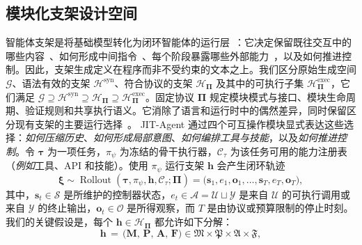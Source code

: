 \documentclass{article}
\newcommand{\ourmethod}{JIT-Agent\xspace}
\begin{document}
\vspace{-0.5em}
\subsection{模块化支架设计空间}
\vspace{-0.5em}
智能体支架是将基础模型转化为闭环智能体的运行层~\citep{202604.0428,zhou2026externalizationllmagentsunified}：它决定保留既往交互中的哪些内容~\citep{hu2026memoryageaiagents}、如何形成中间指令~\citep{cao2025largelanguagemodelsplanning}、每个阶段暴露哪些外部能力~\citep{xu2026agentskillslargelanguage,yang2026efficientagentsmemorytool}，以及如何推进控制。因此，支架生成定义在程序而非不受约束的文本之上。我们区分原始生成空间 $\mathcal{G}$、语法有效的支架 $\mathcal{H}^{\mathrm{syn}}$、符合协议的支架 $\mathcal{H}_{\boldsymbol{\Pi}}$ 及其中的可执行子集 $\mathcal{H}^{\mathrm{exec}}_{\boldsymbol{\Pi}}$，它们满足 $\mathcal{G}\supseteq\mathcal{H}^{\mathrm{syn}}\supseteq\mathcal{H}_{\boldsymbol{\Pi}}\supseteq\mathcal{H}^{\mathrm{exec}}_{\boldsymbol{\Pi}}$。固定协议 $\boldsymbol{\Pi}$ 规定模块模式与接口、模块生命周期、验证规则和共享执行语义。它消除了语言和运行时中的偶然差异，同时保留区分现有支架的主要运行选择~\citep{autogen,githubGitHubAg2aiag2,githubGitHubLangchainailanggraph,luo2025largelanguagemodelagent}。
\ourmethod 通过四个可互操作模块显式表达这些选择：\textit{如何压缩历史}、\textit{如何形成局部意图}、\textit{如何编排工具与技能}，以及\textit{如何推进控制}。令 $\boldsymbol{\tau}$ 为一项任务，$\pi_{\psi}$ 为冻结的骨干执行器，$\mathcal{C}_{\tau}$ 为该任务可用的能力注册表（\textit{例如}工具、API 和技能）。使用 $\pi_{\psi}$ 运行支架 $\mathbf{h}$ 会产生闭环轨迹
\begin{equation}
\label{eq:trajectory}
    \boldsymbol{\xi}
    \sim \operatorname{Rollout}(\boldsymbol{\tau},\pi_{\psi},\mathbf{h},\mathcal{C}_{\tau};\boldsymbol{\Pi})
    = \bigl(\mathbf{s}_1,e_1,\mathbf{o}_1,\ldots,\mathbf{s}_T,e_T,\mathbf{o}_T\bigr),
\end{equation}
其中，$\mathbf{s}_t\in\mathcal{S}$ 是所维护的控制器状态，$e_t\in\mathcal{A}=\mathcal{U}\sqcup\mathcal{Y}$ 是来自 $\mathcal{U}$ 的可执行调用或来自 $\mathcal{Y}$ 的终止输出，$\mathbf{o}_t\in\mathcal{O}$ 是所得观察，而 $T$ 是由协议或预算限制的停止时刻。我们的关键假设是，每个 $\mathbf{h}\in\mathcal{H}_{\boldsymbol{\Pi}}$ 都允许如下分解：
\begin{equation}
\label{eq:harness_decomp}
    \mathbf{h} \,=\, \bigl(\mathbf{M},\, \mathbf{P},\, \mathbf{A},\, \mathbf{F}\bigr)
    \in
    \mathfrak{M} \times \mathfrak{P} \times \mathfrak{A} \times \mathfrak{F},
\end{equation}
\end{document}
